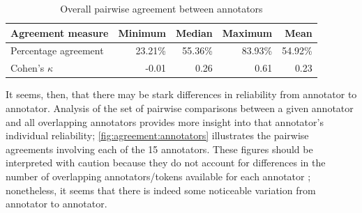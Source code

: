 		\begin{table}[tb]
			\centering
			\caption{Overall pairwise agreement between annotators  }
			\begin{tabular}{lrrrr}
				\toprule
				Agreement measure &	Minimum	& Median &	 Maximum &	 Mean\\
				\midrule
				Percentage agreement &	23.21\%	& 55.36\%	& 83.93\%	& 54.92\% \\
				Cohen's $\kappa$ & 	-0.01	& 0.26	& 0.61	& 0.23 \\
				\bottomrule
			\end{tabular}
			\label{tab:agreement:overall}
		\end{table}
	
	
	
	It seems, then, that there may be stark differences in reliability from annotator to annotator. Analysis of the set of pairwise comparisons between a given annotator and all overlapping annotators provides more insight into that annotator's individual reliability; \cref{fig:agreement:annotators} illustrates the pairwise agreements involving each of the 15 annotators. These figures should be interpreted with caution because they do not account for differences in the number of overlapping annotators/tokens available for each annotator ; nonetheless, it seems that there is indeed some noticeable variation from annotator to annotator. 
		
